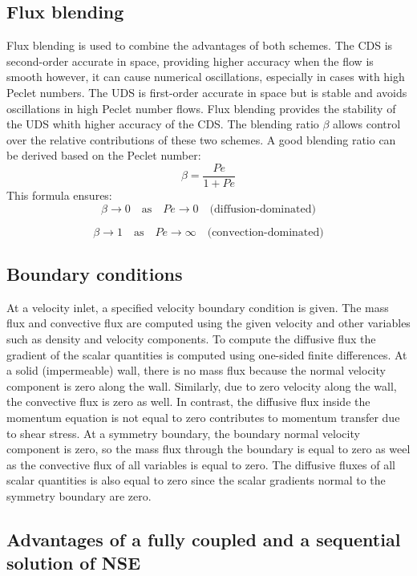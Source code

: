 \documentclass{article}
\begin{document}
\subsection{Flux blending}

Flux blending is used to combine the advantages of both schemes. The CDS is second-order accurate in space, providing higher accuracy when the
flow is smooth however, it can cause numerical oscillations, especially in cases with high Peclet numbers. The UDS is first-order 
accurate in space but is stable and avoids oscillations in high Peclet number flows. Flux blending provides the stability of the UDS whith higher 
accuracy of the CDS. The blending ratio $\beta$ allows control over the relative contributions of these two schemes. A good blending ratio can be derived 
based on the Peclet number:
\[
\beta = \frac{Pe}{1 + Pe}
\]
This formula ensures:
\[
\beta \to 0 \quad \text{as} \quad Pe \to 0 \quad \text{(diffusion-dominated)}
\]

\[
\beta \to 1 \quad \text{as} \quad Pe \to \infty \quad \text{(convection-dominated)}
\]

\subsection{Boundary conditions}

At a velocity inlet, a specified velocity boundary condition is given. The mass flux and convective flux are computed using the given velocity 
and other variables such as density and velocity components. To compute the diffusive flux the gradient of the scalar quantities is computed using
one-sided finite differences. At a solid (impermeable) wall, there is no mass flux because the normal velocity component is zero along the wall. 
Similarly, due to zero velocity along the wall, the convective flux is zero as well. In contrast, the diffusive flux inside the momentum equation 
is not equal to zero contributes to momentum transfer due to shear stress. At a symmetry boundary, the boundary normal velocity component is zero,
so the mass flux through the boundary is equal to zero as weel as the convective flux of all variables is equal to zero. The diffusive fluxes
of all scalar quantities is also equal to zero since the scalar gradients normal to the symmetry boundary are zero.

\subsection{Advantages of a fully coupled and a sequential solution of NSE}
\end{document}
